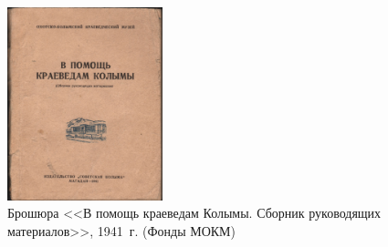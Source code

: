 \begin{figure}
\begin{changemargin}{-1.5cm}{0cm}
    \begin{center}
    \includegraphics[width=0.4\textwidth]{authors/usupova-fig-1.jpg}
  \end{center}
  \caption{Брошюра <<В помощь краеведам Колымы. Сборник руководящих материалов>>, 1941~г. (Фонды МОКМ)}
  \label{fig:usupova-fig-1}
  \end{changemargin}
\end{figure}
